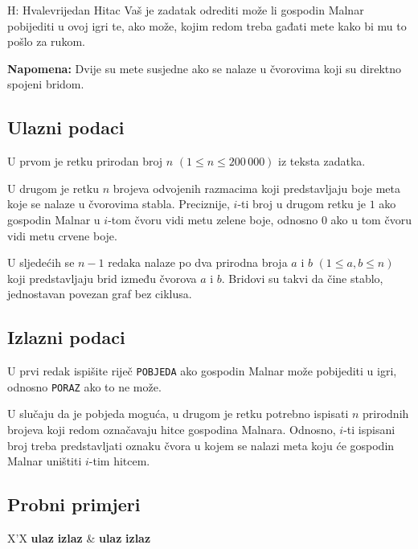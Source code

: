 \begin{statement}[
  timelimit=1 s,
  memorylimit=512 MiB,
]{H: Hvalevrijedan Hitac}
Vaš je zadatak odrediti može li gospodin Malnar pobijediti u ovoj igri te, ako
može, kojim redom treba gađati mete kako bi mu to pošlo za rukom.

\textbf{Napomena:} Dvije su mete susjedne ako se nalaze u čvorovima koji su
direktno spojeni bridom.

\subsection*{Ulazni podaci}
U prvom je retku prirodan broj $n$ $(1 \le n \le 200\,000)$ iz teksta zadatka.

U drugom je retku $n$ brojeva odvojenih razmacima koji predstavljaju boje meta
koje se nalaze u čvorovima stabla. Preciznije, $i$-ti broj u drugom retku je $1$
ako gospodin Malnar u $i$-tom čvoru vidi metu zelene boje, odnosno $0$ ako u tom
čvoru vidi metu crvene boje.

U sljedećih se $n-1$ redaka nalaze po dva prirodna broja $a$ i $b$ $(1 \le a, b
\le n)$ koji predstavljaju brid između čvorova $a$ i $b$. Bridovi su takvi da
čine stablo, jednostavan povezan graf bez ciklusa.

\subsection*{Izlazni podaci}
U prvi redak ispišite riječ \texttt{POBJEDA} ako gospodin Malnar može
pobijediti u igri, odnosno \texttt{PORAZ} ako to ne može.

U slučaju da je pobjeda moguća, u drugom je retku potrebno ispisati $n$
prirodnih brojeva koji redom označavaju hitce gospodina Malnara. Odnosno,
$i$-ti ispisani broj treba predstavljati oznaku čvora u kojem se nalazi meta
koju će gospodin Malnar uništiti $i$-tim hitcem.

\subsection*{Probni primjeri}
\begin{tabularx}{\textwidth}{X'X}
  \textbf{ulaz}
  \linespread{1}{}
  \textbf{izlaz}
  \linespread{1}{} &
  \textbf{ulaz}
  \linespread{1}{}
  \textbf{izlaz}
  \linespread{1}{}
\end{tabularx}

\end{statement}

